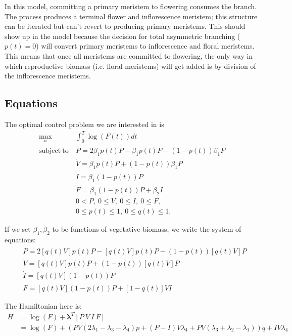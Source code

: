 \documentclass[12pt, oneside]{article}   	%
\begin{document}
In this model, committing a primary meristem to flowering consumes the branch. The process produces a terminal flower and inflorescence meristem; this structure can be iterated but can't revert to producing primary meristems. This should show up in the model because the decision for total asymmetric branching ($p(t)=0$) will convert primary meristems to inflorescence and floral meristems. This means that once all meristems are committed to flowering, the only way in which reproductive biomass (i.e. floral meristems) will get added is by division of the inflorescence meristems. 

\subsection{Equations}

The optimal control problem we are interested in is
%
\begin{align}
\max_{u} &  \int_0^T \log( F(t) ) dt \nonumber \\
\mathrm{subject\ to\ } 
& \dot{P}  = 2 \beta_1 p(t) P - \beta_1 p(t) P - ( 1-p(t) ) \beta_1 P \nonumber \\
& \dot{V} = \beta_1 p(t) P + ( 1-p(t) ) \beta_1 P \nonumber \\
& \dot{I}  = \beta_1 ( 1-p(t) ) P \nonumber \\ 
& \dot{F}  = \beta_1 ( 1-p(t) ) P + \beta_2 I
 \nonumber \\ 
& 0 < P,\ 0 \leq V,\ 0 \leq I,\ 0 \leq F, \nonumber\\
& 0 \leq p(t) \leq 1,\ 0 \leq q(t) \leq 1. \nonumber
\end{align}

If we set $\beta_1, \beta_2$ to be functions of vegetative biomass, we write the system of equations:
%
\begin{align}
& \dot{P}  = 2 [q(t) V] p(t) P - [q(t) V] p(t) P - ( 1-p(t) ) [q(t) V] P \nonumber \\
& \dot{V} = [q(t) V] p(t) P + ( 1-p(t) ) [q(t) V] P \nonumber \\
& \dot{I}  = [q(t) V] ( 1-p(t) ) P \nonumber \\ 
& \dot{F}  = [q(t) V] ( 1-p(t) ) P + [1-q(t)] V I
\end{align}

The Hamiltonian here is:
%
\begin{align}
H & = \log( F ) + \bm{\lambda}^T [P\ V\ I\ F] \\
& = \log( F ) + \left(PV \left(2\lambda_1 -\lambda_3-\lambda_4 \right)p+\left(P-I\right)V\lambda_4+PV (
\lambda_3+\lambda_2-\lambda_1) \right)q+I
 V\lambda_4
\end{align}
\end{document}
